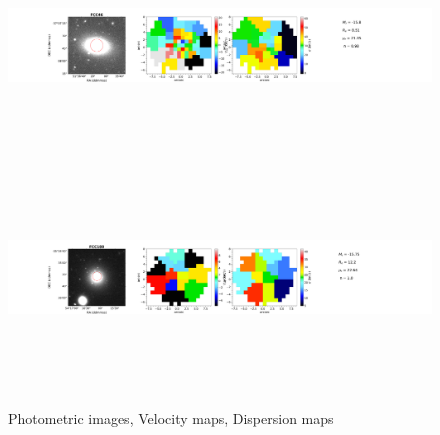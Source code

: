 \documentclass{aa}
\begin{document}
\begin{figure}[!htb]
   \includegraphics[width=21cm,height=6cm,keepaspectratio]{../2_pipeline/1_V&S_Maps/46Velocity_map.pdf}
   \includegraphics[width=21cm,height=6cm,keepaspectratio]{../2_pipeline/1_V&S_Maps/188Velocity_map.pdf}
         \caption{Photometric images, Velocity maps, Dispersion maps}
         \label{FigVelDis}
\end{figure}
\clearpage
%
\end{document}
